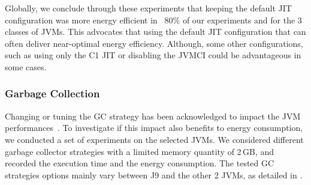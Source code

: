 Globally, we conclude through these experiments that keeping the default JIT configuration was more energy efficient in ~80\% of our experiments and for the 3 classes of JVMs.
This advocates that using the default JIT configuration that can often deliver near-optimal energy efficiency.
Although, some other configurations, such as using only the C1 JIT or disabling the JVMCI could be advantageous in some cases.


\subsubsection{Garbage Collection}
Changing or tuning the GC strategy has been acknowledged to impact the JVM performances~\cite{10.1145/2568088.2568097}.
To investigate if this impact also benefits to energy consumption, we conducted a set of experiments on the selected JVMs.
We considered different garbage collector strategies with a limited memory quantity of 2\,GB, and recorded the execution time and the energy consumption.
The tested GC strategies options mainly vary between \textsc{J9} and the other 2 JVMs, as detailed in .

